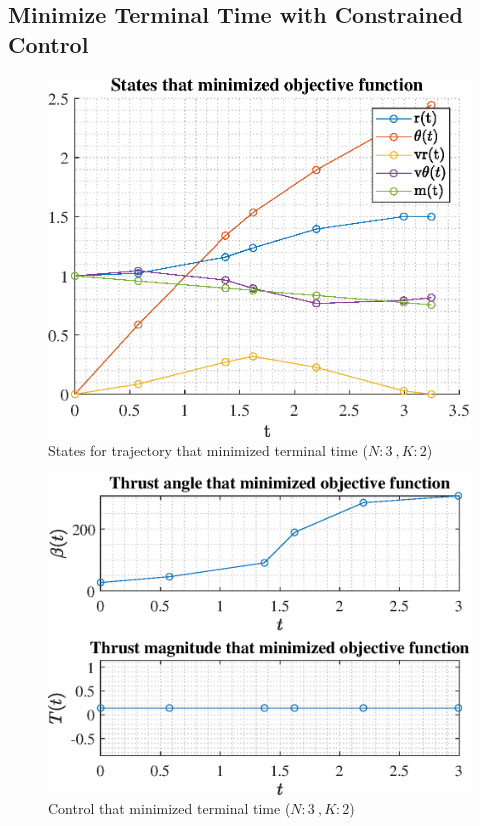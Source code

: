 \documentclass[]{article}
\begin{document}
	\subsection{Minimize Terminal Time with Constrained Control}
\begin{figure}
	\centering
	\includegraphics[scale=0.75]{states_N3_K2_C3_tf.eps}
	\caption{States for trajectory that minimized terminal time (\(N:3\ , K:2\))}
	\label{fig:states_N3_K2_C3_tf}
\end{figure}
\begin{figure}
	\centering
	\includegraphics[scale=0.75]{control_N3_K2_C3_tf.eps}
	\caption{Control that minimized terminal time (\(N:3\ , K:2\))}
	\label{fig:control_N3_K2_C3_tf}
\end{figure}
\end{document}

